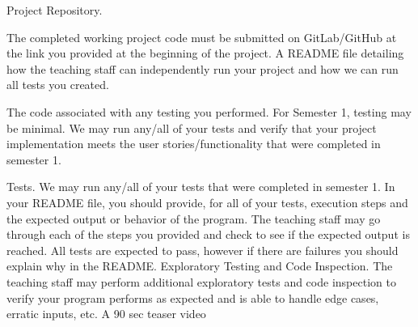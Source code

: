\documentclass[12pt]{article}
\begin{document}
    Project Repository. 

        The completed working project code must be submitted on GitLab/GitHub at the link you provided at the beginning of the project. 
        A README file detailing how the teaching staff can independently run your project and how we can run all tests you created.

        The code associated with any testing you performed.  For Semester 1, testing may be minimal. We may run any/all of your tests and verify that your project implementation meets the user stories/functionality that were completed in semester 1.

            Tests. We may run any/all of your tests that were completed in semester 1. In your README file, you should provide, for all of your tests, execution steps and the expected output or behavior of the program. The teaching staff may go through each of the steps you provided and check to see if the expected output is reached. All tests are expected to pass, however if there are failures you should explain why in the README.
            Exploratory Testing and Code Inspection. The teaching staff may perform additional exploratory tests and code inspection to verify your program performs as expected and is able to handle edge cases, erratic inputs, etc.
    A 90 sec teaser video
\end{document}
